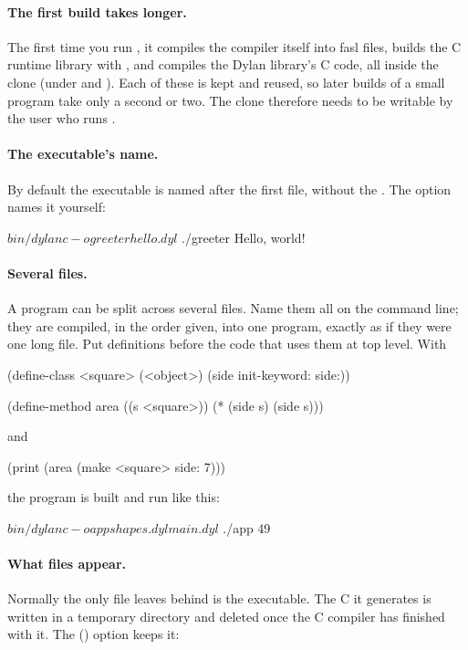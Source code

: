 \paragraph{The first build takes longer.} The first time you run
, it compiles the compiler itself into fasl files, builds the
C runtime library with , and compiles the Dylan library's C
code, all inside the clone (under  and
). Each of these is kept and reused, so later
builds of a small program take only a second or two. The clone therefore
needs to be writable by the user who runs .

\paragraph{The executable's name.} By default the executable is named
after the first file, without the . The  option names it
yourself:

\begin{shell}
$ bin/dylanc -o greeter hello.dyl
$ ./greeter
Hello, world!
\end{shell}

\paragraph{Several files.} A program can be split across several files.
Name them all on the command line; they are compiled, in the order given,
into one program, exactly as if they were one long file. Put definitions
before the code that uses them at top level. With 

\begin{dylan}
(define-class <square> (<object>)
  (side init-keyword: side:))

(define-method area ((s <square>))
  (* (side s) (side s)))
\end{dylan}

\noindent and 

\begin{dylan}
(print (area (make <square> side: 7)))
\end{dylan}

\noindent the program is built and run like this:

\begin{shell}
$ bin/dylanc -o app shapes.dyl main.dyl
$ ./app
49
\end{shell}

\paragraph{What files appear.} Normally the only file  leaves
behind is the executable. The C it generates is written in a temporary
directory and deleted once the C compiler has finished with it. The  () option keeps it:

